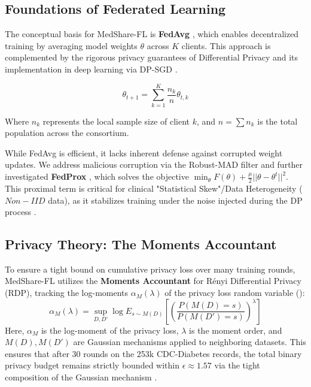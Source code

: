\documentclass[10pt, a4paper, twocolumn]{article}
\begin{document}
\subsection{Foundations of Federated Learning}
The conceptual basis for MedShare-FL is \textbf{FedAvg} \cite{mcmahan2017}, which enables decentralized training by averaging model weights $\theta$ across $K$ clients. This approach is complemented by the rigorous privacy guarantees of Differential Privacy \cite{dwork2006} and its implementation in deep learning via DP-SGD \cite{abadi2016}.

\begin{equation}
    \theta_{t+1} = \sum_{k=1}^K \frac{n_k}{n} \theta_{t,k}
\end{equation}

Where $n_k$ represents the local sample size of client $k$, and $n = \sum n_k$ is the total population across the consortium.

While FedAvg is efficient, it lacks inherent defense against corrupted weight updates. We address malicious corruption via the Robust-MAD filter and further investigated \textbf{FedProx} \cite{li2020}, which solves the objective $\min_{\theta} F(\theta) + \frac{\mu}{2} ||\theta - \theta^t||^2$. This proximal term is critical for clinical "Statistical Skew"/Data Heterogeneity ($Non-IID$ data), as it stabilizes training under the noise injected during the DP process \cite{hardt2016}.

\subsection{Privacy Theory: The Moments Accountant}
To ensure a tight bound on cumulative privacy loss over many training rounds, MedShare-FL utilizes the \textbf{Moments Accountant} for Rényi Differential Privacy (RDP), tracking the log-moments $\alpha_M(\lambda)$ of the privacy loss random variable (\cite{abadi2016}):
\begin{equation}
    \alpha_M(\lambda) = \sup_{D, D'} \log E_{s \sim M(D)} [ (\frac{P(M(D)=s)}{P(M(D')=s)})^{\lambda} ]
\end{equation}
Here, $\alpha_M$ is the log-moment of the privacy loss, $\lambda$ is the moment order, and $M(D), M(D')$ are Gaussian mechanisms applied to neighboring datasets. This ensures that after 30 rounds on the 253k CDC-Diabetes records, the total binary privacy budget remains strictly bounded within $\epsilon \approx 1.57$ via the tight composition of the Gaussian mechanism \cite{abadi2016, dworkroth2014}.
\end{document}
